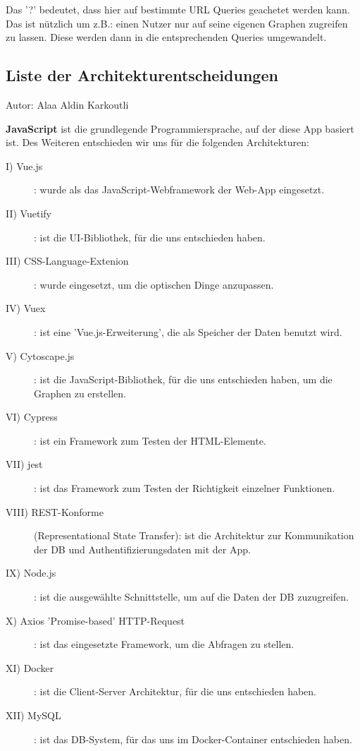 \documentclass[twoside]{report}
\begin{document}
Das '?' bedeutet, dass hier auf bestimmte URL Queries geachetet werden kann.
Das ist nützlich um z.B.: einen Nutzer nur auf seine eigenen Graphen zugreifen zu lassen.
Diese werden dann in die entsprechenden Queries umgewandelt.\\

\subsection{Liste der Architekturentscheidungen}
{\small Autor: Alaa Aldin Karkoutli}\newline

\textbf{JavaScript} ist die grundlegende Programmiersprache, auf der diese App basiert ist. Des Weiteren entschieden wir uns für die folgenden Architekturen:
\begin{description}
    \item [I) Vue.js]: wurde als das JavaScript-Webframework der Web-App eingesetzt. 
    \item [II) Vuetify]: ist die UI-Bibliothek, für die uns entschieden haben.  
    \item [III) CSS-Language-Extenion]: wurde eingesetzt, um die optischen Dinge anzupassen.
    \item [IV) Vuex]: ist eine 'Vue.js-Erweiterung', die als Speicher der Daten benutzt wird.
    \item [V) Cytoscape.js]: ist die JavaScript-Bibliothek, für die uns entschieden haben, um die Graphen zu erstellen.
    \item [VI) Cypress]: ist ein Framework zum Testen der HTML-Elemente.
    \item [VII) jest]: ist das Framework zum Testen der Richtigkeit einzelner Funktionen.
    \item [VIII) REST-Konforme] (Representational State Transfer): ist die Architektur zur Kommunikation der DB und Authentifizierungsdaten mit der App.
    \item [IX) Node.js]: ist die ausgewählte Schnittstelle, um auf die Daten der DB zuzugreifen.
    \item [X) Axios 'Promise-based' HTTP-Request]: ist das eingesetzte Framework, um die Abfragen zu stellen. 
    \item [XI) Docker]: ist die Client-Server Architektur, für die uns entschieden haben.
    \item [XII) MySQL]: ist das DB-System, für das uns im Docker-Container entschieden haben.  
\end{description}
\end{document}

